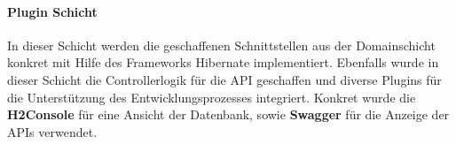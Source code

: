 			\paragraph{Plugin Schicht}
			In dieser Schicht werden die geschaffenen Schnittstellen aus der Domainschicht konkret mit Hilfe des Frameworks Hibernate implementiert. Ebenfalls wurde in dieser Schicht die Controllerlogik für die API geschaffen und diverse Plugins für die Unterstützung des Entwicklungsprozesses integriert. Konkret wurde die \textbf{H2Console} für eine Ansicht der Datenbank, sowie \textbf{Swagger} für die Anzeige der APIs verwendet.